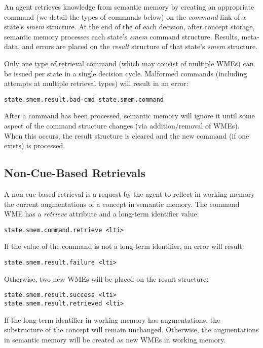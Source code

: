An agent retrieves knowledge from semantic memory by creating an appropriate command (we detail the types of commands below) on the \emph{command} link of a state's \emph{smem} structure. At the end of the  of each decision, after concept storage, semantic memory processes each state's \emph{smem} command structure.  Results, meta-data, and errors are placed on the \emph{result} structure of that state's \emph{smem} structure.

Only one type of retrieval command (which may consist of multiple WMEs) can be issued per state in a single decision cycle.  Malformed commands (including attempts at multiple retrieval types) will result in an error:

\begin{verbatim}
state.smem.result.bad-cmd state.smem.command
\end{verbatim}

After a command has been processed, semantic memory will ignore it until some aspect of the command structure changes (via addition/removal of WMEs).  When this occurs, the result structure is cleared and the new command (if one exists) is processed.

\subsection{Non-Cue-Based Retrievals}
A non-cue-based retrieval is a request by the agent to reflect in working memory the current augmentations of a concept in semantic memory. The command WME has a \emph{retrieve} attribute and a long-term identifier value:

\begin{verbatim}
state.smem.command.retrieve <lti>
\end{verbatim}

If the value of the command is not a long-term identifier, an error will result: 

\begin{verbatim}
state.smem.result.failure <lti>
\end{verbatim}

Otherwise, two new WMEs will be placed on the result structure:

\begin{verbatim}
state.smem.result.success <lti>
state.smem.result.retrieved <lti>
\end{verbatim}

If the long-term identifier in working memory has augmentations, the substructure of the concept will remain unchanged. Otherwise, the augmentations in semantic memory will be created as new WMEs in working memory.

